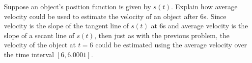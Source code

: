 {Suppose an object's position function is given by $s(t)$.  Explain how average velocity could be used to estimate the velocity of an object after $6$s.}
{Since velocity is the slope of the tangent line of $s(t)$ at $6$s and average velocity is the slope of a secant line of $s(t)$, then just as with the previous problem, the velocity of the object at $t=6$ could be estimated using the average velocity over the time interval $[6,6.0001]$.}